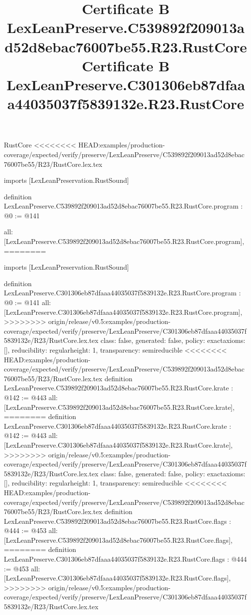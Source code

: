 \begin{lexlean}{RustCore}
<<<<<<<< HEAD:examples/production-coverage/expected/verify/preserve/LexLeanPreserve/C539892f209013ad52d8ebac76007be55/R23/RustCore.lex.tex
\title{Certificate B LexLeanPreserve.C539892f209013ad52d8ebac76007be55.R23.RustCore}
\begin{coremodule}
imports [LexLeanPreservation.RustSound]

definition LexLeanPreserve.C539892f209013ad52d8ebac76007be55.R23.RustCore.program : @0 := @141 {
  all: [LexLeanPreserve.C539892f209013ad52d8ebac76007be55.R23.RustCore.program],
========
\title{Certificate B LexLeanPreserve.C301306eb87dfaaa44035037f5839132e.R23.RustCore}
\begin{coremodule}
imports [LexLeanPreservation.RustSound]

definition LexLeanPreserve.C301306eb87dfaaa44035037f5839132e.R23.RustCore.program : @0 := @141 {
  all: [LexLeanPreserve.C301306eb87dfaaa44035037f5839132e.R23.RustCore.program],
>>>>>>>> origin/release/v0.5:examples/production-coverage/expected/verify/preserve/LexLeanPreserve/C301306eb87dfaaa44035037f5839132e/R23/RustCore.lex.tex
  class: false,
  generated: false,
  policy: exact{axioms: []},
  reducibility: regular{height: 1},
  transparency: semireducible
}
<<<<<<<< HEAD:examples/production-coverage/expected/verify/preserve/LexLeanPreserve/C539892f209013ad52d8ebac76007be55/R23/RustCore.lex.tex
definition LexLeanPreserve.C539892f209013ad52d8ebac76007be55.R23.RustCore.krate : @142 := @443 {
  all: [LexLeanPreserve.C539892f209013ad52d8ebac76007be55.R23.RustCore.krate],
========
definition LexLeanPreserve.C301306eb87dfaaa44035037f5839132e.R23.RustCore.krate : @142 := @443 {
  all: [LexLeanPreserve.C301306eb87dfaaa44035037f5839132e.R23.RustCore.krate],
>>>>>>>> origin/release/v0.5:examples/production-coverage/expected/verify/preserve/LexLeanPreserve/C301306eb87dfaaa44035037f5839132e/R23/RustCore.lex.tex
  class: false,
  generated: false,
  policy: exact{axioms: []},
  reducibility: regular{height: 1},
  transparency: semireducible
}
<<<<<<<< HEAD:examples/production-coverage/expected/verify/preserve/LexLeanPreserve/C539892f209013ad52d8ebac76007be55/R23/RustCore.lex.tex
definition LexLeanPreserve.C539892f209013ad52d8ebac76007be55.R23.RustCore.flags : @444 := @453 {
  all: [LexLeanPreserve.C539892f209013ad52d8ebac76007be55.R23.RustCore.flags],
========
definition LexLeanPreserve.C301306eb87dfaaa44035037f5839132e.R23.RustCore.flags : @444 := @453 {
  all: [LexLeanPreserve.C301306eb87dfaaa44035037f5839132e.R23.RustCore.flags],
>>>>>>>> origin/release/v0.5:examples/production-coverage/expected/verify/preserve/LexLeanPreserve/C301306eb87dfaaa44035037f5839132e/R23/RustCore.lex.tex
}}}
\end{coremodule}}
\end{coremodule}
\end{lexlean}
